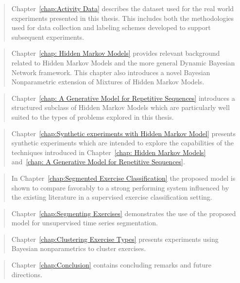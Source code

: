 \documentclass[12pt]{report}
\newcommand{\1}[0]{\mathbbm{1}}
\begin{document}
\begin{quote}
    Chapter~\ref{chap:Activity Data} describes the dataset used
    for the real world experiments presented in this thesis.
    This includes both the methodologies used for data collection
    and labeling schemes developed to support subsequent experiments.
\end{quote}

\begin{quote}
    Chapter~\ref{chap: Hidden Markov Models} provides relevant background
    related to Hidden Markov Models and the more general Dynamic Bayesian Network
    framework. This chapter also introduces a novel Bayesian Nonparametric extension
    of Mixtures of Hidden Markov Models.
\end{quote}

\begin{quote}
    Chapter~\ref{chap: A Generative Model for Repetitive Sequences} introduces
    a structured subclass of Hidden Markov Models which are particularly well suited
    to the types of problems explored in this thesis.
\end{quote}

\begin{quote}
    Chapter~\ref{chap:Synthetic experiments with Hidden Markov Model} presents
    synthetic experiments which are intended to explore the capabilities of the
    techniques introduced in Chapter~\ref{chap: Hidden Markov Models}
    and~\ref{chap: A Generative Model for Repetitive Sequences}.
\end{quote}

\begin{quote}
    In Chapter~\ref{chap:Segmented Exercise Classification} the proposed
    model is shown to compare favorably to a strong performing system influenced
    by the existing literature in a supervised exercise classification setting.
\end{quote}

\begin{quote}
    Chapter~\ref{chap:Segmenting Exercises} demonstrates the use of the proposed
    model for unsupervised time series segmentation.
\end{quote}

\begin{quote}
    Chapter~\ref{chap:Clustering Exercise Types} presents experiments
    using Bayesian nonparametrics to cluster exercises.
\end{quote}

\begin{quote}
    Chapter~\ref{chap:Conclusion} contains concluding remarks and future directions.
\end{quote}
\end{document}
